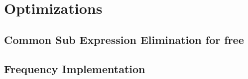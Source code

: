 \section{Optimizations}
\subsection{Common Sub Expression Elimination for free}
\subsection{Frequency Implementation}

